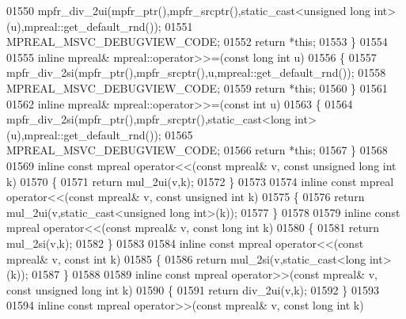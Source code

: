\begin{DoxyCode}
01550     mpfr\_div\_2ui(mpfr\_ptr(),mpfr\_srcptr(),static\_cast<unsigned long int>(u),mpreal::get\_default\_rnd());
01551     MPREAL\_MSVC\_DEBUGVIEW\_CODE;
01552     \textcolor{keywordflow}{return} *\textcolor{keyword}{this};
01553 \}
01554 
01555 \textcolor{keyword}{inline} mpreal& mpreal::operator>>=(\textcolor{keyword}{const} \textcolor{keywordtype}{long} \textcolor{keywordtype}{int} u)
01556 \{
01557     mpfr\_div\_2si(mpfr\_ptr(),mpfr\_srcptr(),u,mpreal::get\_default\_rnd());
01558     MPREAL\_MSVC\_DEBUGVIEW\_CODE;
01559     \textcolor{keywordflow}{return} *\textcolor{keyword}{this};
01560 \}
01561 
01562 \textcolor{keyword}{inline} mpreal& mpreal::operator>>=(\textcolor{keyword}{const} \textcolor{keywordtype}{int} u)
01563 \{
01564     mpfr\_div\_2si(mpfr\_ptr(),mpfr\_srcptr(),static\_cast<long int>(u),mpreal::get\_default\_rnd());
01565     MPREAL\_MSVC\_DEBUGVIEW\_CODE;
01566     \textcolor{keywordflow}{return} *\textcolor{keyword}{this};
01567 \}
01568 
01569 \textcolor{keyword}{inline} \textcolor{keyword}{const} mpreal operator<<(\textcolor{keyword}{const} mpreal& v, \textcolor{keyword}{const} \textcolor{keywordtype}{unsigned} \textcolor{keywordtype}{long} \textcolor{keywordtype}{int} k)
01570 \{
01571     \textcolor{keywordflow}{return} mul\_2ui(v,k);
01572 \}
01573 
01574 \textcolor{keyword}{inline} \textcolor{keyword}{const} mpreal operator<<(\textcolor{keyword}{const} mpreal& v, \textcolor{keyword}{const} \textcolor{keywordtype}{unsigned} \textcolor{keywordtype}{int} k)
01575 \{
01576     \textcolor{keywordflow}{return} mul\_2ui(v,static\_cast<unsigned long int>(k));
01577 \}
01578 
01579 \textcolor{keyword}{inline} \textcolor{keyword}{const} mpreal operator<<(\textcolor{keyword}{const} mpreal& v, \textcolor{keyword}{const} \textcolor{keywordtype}{long} \textcolor{keywordtype}{int} k)
01580 \{
01581     \textcolor{keywordflow}{return} mul\_2si(v,k);
01582 \}
01583 
01584 \textcolor{keyword}{inline} \textcolor{keyword}{const} mpreal operator<<(\textcolor{keyword}{const} mpreal& v, \textcolor{keyword}{const} \textcolor{keywordtype}{int} k)
01585 \{
01586     \textcolor{keywordflow}{return} mul\_2si(v,static\_cast<long int>(k));
01587 \}
01588 
01589 \textcolor{keyword}{inline} \textcolor{keyword}{const} mpreal operator>>(\textcolor{keyword}{const} mpreal& v, \textcolor{keyword}{const} \textcolor{keywordtype}{unsigned} \textcolor{keywordtype}{long} \textcolor{keywordtype}{int} k)
01590 \{
01591     \textcolor{keywordflow}{return} div\_2ui(v,k);
01592 \}
01593 
01594 \textcolor{keyword}{inline} \textcolor{keyword}{const} mpreal operator>>(\textcolor{keyword}{const} mpreal& v, \textcolor{keyword}{const} \textcolor{keywordtype}{long} \textcolor{keywordtype}{int} k)

\end{DoxyCode}
